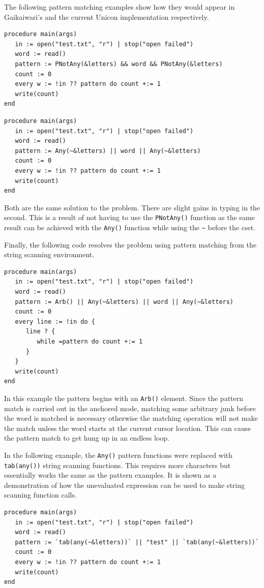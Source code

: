 \documentclass{article}
\begin{document}
The following pattern matching examples show how they would appear in Gaikaiwari's and the current Unicon implementation respectively.\\
\begin{verbatim}
procedure main(args)
   in := open("test.txt", "r") | stop("open failed")
   word := read()
   pattern := PNotAny(&letters) && word && PNotAny(&letters)
   count := 0
   every w := !in ?? pattern do count +:= 1
   write(count)
end
\end{verbatim}

\begin{verbatim}
procedure main(args)
   in := open("test.txt", "r") | stop("open failed")
   word := read()
   pattern := Any(~&letters) || word || Any(~&letters)
   count := 0
   every w := !in ?? pattern do count +:= 1
   write(count)
end
\end{verbatim}
Both are the same solution to the problem.  There are slight gains in typing in the second.  This is a result of not having to use the \texttt{PNotAny()} function as the same result can be achieved with the \texttt{Any()} function while using the \texttt{\~} before the cset.  

Finally, the following code resolves the problem using pattern matching from the string scanning environment.\\
\begin{verbatim}
procedure main(args)
   in := open("test.txt", "r") | stop("open failed")
   word := read()
   pattern := Arb() || Any(~&letters) || word || Any(~&letters)
   count := 0
   every line := !in do {
      line ? {
         while =pattern do count +:= 1
      }
   }
   write(count)
end
\end{verbatim}
In this example the pattern begins with an \texttt{Arb()} element.  Since the pattern match is carried out in the anchored mode, matching some arbitrary junk before the word is matched is necessary otherwise the matching operation will not make the match unless the word starts at the current cursor location.  This can cause the pattern match to get hung up in an endless loop.

In the following example, the \texttt{Any()} pattern functions were replaced with \texttt{tab(any())} string scanning functions.  This requires more characters but essentially works the same as the pattern examples.  It is shown as a demonstration of how the unevaluated expression can be used to make string scanning function calls.\\
\begin{verbatim}
procedure main(args)
   in := open("test.txt", "r") | stop("open failed")
   word := read()
   pattern := `tab(any(~&letters))` || "test" || `tab(any(~&letters))`
   count := 0
   every w := !in ?? pattern do count +:= 1
   write(count)
end
\end{verbatim}
\end{document}

